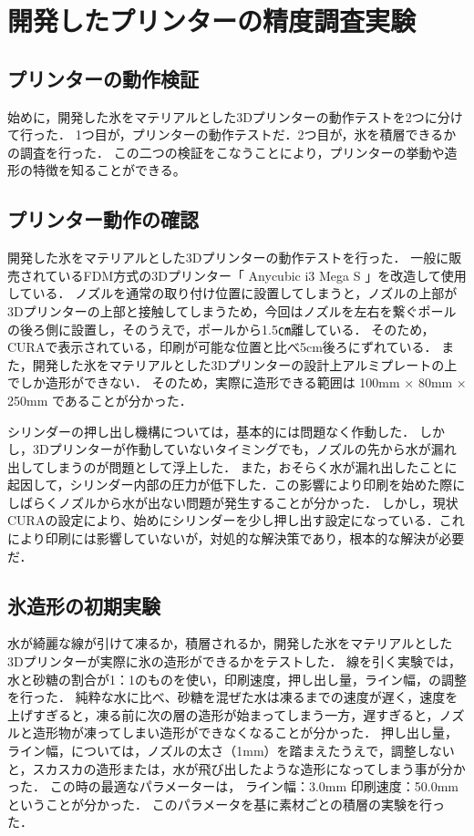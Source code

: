 \chapter{開発したプリンターの精度調査実験}
\label{chp:first}

\section{プリンターの動作検証}
\label{sec:paragraph}
始めに，開発した氷をマテリアルとした3Dプリンターの動作テストを2つに分けて行った．
1つ目が，プリンターの動作テストだ．2つ目が，氷を積層できるかの調査を行った．
この二つの検証をこなうことにより，プリンターの挙動や造形の特徴を知ることができる。

\section{プリンター動作の確認}
\label{sec:paragraph}
開発した氷をマテリアルとした3Dプリンターの動作テストを行った．
一般に販売されているFDM方式の3Dプリンター「 Anycubic i3 Mega S 」を改造して使用している．
ノズルを通常の取り付け位置に設置してしまうと，ノズルの上部が3Dプリンターの上部と接触してしまうため，今回はノズルを左右を繋ぐポールの後ろ側に設置し，そのうえで，ポールから1.5㎝離している．
そのため，CURAで表示されている，印刷が可能な位置と比べ5cm後ろにずれている．
また，開発した氷をマテリアルとした3Dプリンターの設計上アルミプレートの上でしか造形ができない．
そのため，実際に造形できる範囲は 100mm × 80mm × 250mm であることが分かった．

シリンダーの押し出し機構については，基本的には問題なく作動した．
しかし，3Dプリンターが作動していないタイミングでも，ノズルの先から水が漏れ出してしまうのが問題として浮上した．
また，おそらく水が漏れ出したことに起因して，シリンダー内部の圧力が低下した．この影響により印刷を始めた際にしばらくノズルから水が出ない問題が発生することが分かった．
しかし，現状CURAの設定により、始めにシリンダーを少し押し出す設定になっている．これにより印刷には影響していないが，対処的な解決策であり，根本的な解決が必要だ．


\section{氷造形の初期実験}
\label{sec:paragraph}
水が綺麗な線が引けて凍るか，積層されるか，開発した氷をマテリアルとした3Dプリンターが実際に氷の造形ができるかをテストした．
線を引く実験では，水と砂糖の割合が1：1のものを使い，印刷速度，押し出し量，ライン幅，の調整を行った．
純粋な水に比べ、砂糖を混ぜた水は凍るまでの速度が遅く，速度を上げすぎると，凍る前に次の層の造形が始まってしまう一方，遅すぎると，ノズルと造形物が凍ってしまい造形ができなくなることが分かった．
押し出し量，ライン幅，については，ノズルの太さ（1mm）を踏まえたうえで，調整しないと，スカスカの造形または，水が飛び出したような造形になってしまう事が分かった．
この時の最適なパラメーターは， ライン幅：3.0mm 印刷速度：50.0mmということが分かった．
このパラメータを基に素材ごとの積層の実験を行った．

